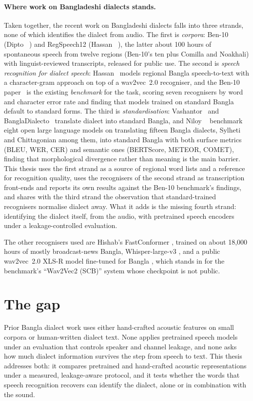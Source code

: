 \paragraph{Where work on Bangladeshi dialects stands.} Taken together, the
recent work on Bangladeshi dialects falls into three strands, none of which
identifies the dialect from audio. The first is \emph{corpora}: Ben-10
(Dipto \etal~\cite{Dipto2025ASR}) and RegSpeech12
(Hassan \etal~\cite{Hassan2025RegSpeech12}), the latter about 100 hours of
spontaneous speech from twelve regions (Ben-10's ten plus Comilla and
Noakhali) with linguist-reviewed transcripts, released for public use. The
second is \emph{speech recognition for dialect speech}: Hassan~\cite{Hassan2024Character}
models regional Bangla speech-to-text with a character-gram approach on top of a
wav2vec~2.0 recogniser, and the Ben-10 paper~\cite{Dipto2025ASR} is the existing
\emph{benchmark} for the task, scoring seven recognisers by word and character
error rate and finding that models trained on standard Bangla default to
standard forms. The third is \emph{standardisation}: Vashantor~\cite{Faria2023Vashantor}
and BanglaDialecto~\cite{Samin2024BanglaDialecto} translate dialect into
standard Bangla, and Niloy \etal~\cite{Niloy2026Meaning} benchmark eight open
large language models on translating fifteen Bangla dialects, Sylheti and
Chittagonian among them, into standard Bangla with both surface metrics (BLEU,
WER, CER) and semantic ones (BERTScore, METEOR, COMET), finding that
morphological divergence rather than meaning is the main barrier. This thesis
uses the first strand as a source of regional word lists and a reference for
recognition quality, uses the recognisers of the second strand as transcription
front-ends and reports its own results against the Ben-10 benchmark's
findings, and shares with the third strand the observation that standard-trained
recognisers normalise dialect away. What it adds is the missing fourth strand:
identifying the dialect itself, from the audio, with pretrained speech encoders
under a leakage-controlled evaluation.

The other recognisers used are Hishab's FastConformer \cite{Hishab2023FastConformer},
trained on about 18,000 hours of mostly broadcast-news Bangla, Whisper-large-v3
\cite{Radford2023Robust}, and a public wav2vec~2.0 XLS-R model fine-tuned for
Bangla \cite{Arijitx2022wav2vec2}, which stands in for the benchmark's
``Wav2Vec2 (SCB)'' system whose checkpoint is not public.

\section{The gap}
\label{sec:bg-gap}

Prior Bangla dialect work uses either hand-crafted acoustic features on small
corpora or human-written dialect text. None applies pretrained speech models
under an evaluation that controls speaker and channel leakage, and none asks how
much dialect information survives the step from speech to text. This thesis
addresses both: it compares pretrained and hand-crafted acoustic
representations under a measured, leakage-aware protocol, and it tests whether
the words that speech recognition recovers can identify the dialect, alone or in
combination with the sound.
